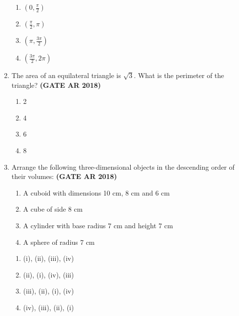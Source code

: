 \documentclass[journal,15pt,onecolumn]{IEEEtran}
\theoremstyle{remark}
\begin{document}
\begin{enumerate}
\vspace{0.5cm}

\begin{enumerate} 
\item   $ \left( 0, \frac{\pi}{2} \right)  $
\item    $ \left( \frac{\pi}{2}, \pi \right)  $  
\item    $ \left( \pi, \frac{3\pi}{2} \right)  $  
\item    $ \left( \frac{3\pi}{2}, 2\pi \right)  $ 
\end{enumerate}

\vspace{0.8cm}

\item 
The area of an equilateral triangle is  $ \sqrt{3}  $. What is the perimeter of the triangle?\hfill \textbf{ (GATE AR 2018)}

\vspace{0.5cm}

\begin{enumerate}
\item  2 
\item  4 
\item  6 
\item  8 
\end{enumerate}

\vspace{0.5cm}


\item 
Arrange the following three-dimensional objects in the descending order of their volumes:\hfill \textbf{ (GATE AR 2018)}


\begin{enumerate}
    \item A cuboid with dimensions 10 cm, 8 cm and 6 cm
    \item A cube of side 8 cm
    \item A cylinder with base radius 7 cm and height 7 cm
    \item A sphere of radius 7 cm
\end{enumerate}



\begin{enumerate}
\item (i), (ii), (iii), (iv) 
\item (ii), (i), (iv), (iii) 
\item (iii), (ii), (i), (iv) 
\item (iv), (iii), (ii), (i) 
\end{enumerate}



\end{enumerate}
\end{document}
